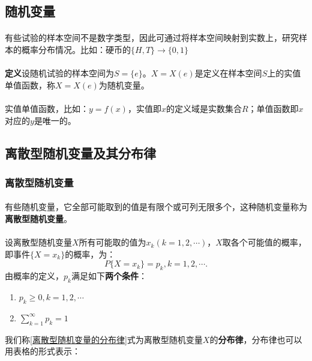 \subsection{随机变量}
\paragraph{}
有些试验的样本空间不是数字类型，因此可通过将样本空间映射到实数上，研究样本的概率分布情况。比如：硬币的$\{H,T\} \to \{0, 1\}$
\paragraph{}
\textbf{定义\;}设随机试验的样本空间为$S=\{e\}$。$X = X(e)$是定义在样本空间$S$上的实值单值函数，称$X=X(e)$为随机变量。

\paragraph{}
实值单值函数，比如：$y=f(x)$，实值即$x$的定义域是实数集合$R$；单值函数即$x$对应的$y$是唯一的。

\subsection{离散型随机变量及其\textbf{分布律}}
\subsubsection{离散型随机变量}
\paragraph{}
有些随机变量，它全部可能取到的值是有限个或可列无限多个，这种随机变量称为\textbf{离散型随机变量}。

\paragraph{}
设离散型随机变量$X$所有可能取的值为$x_k(k=1,2,\cdots)$，$X$取各个可能值的概率，即事件$\{X = x_k\}$的概率，为：
\begin{equation}
  \label{离散型随机变量的分布律}
  P\{X = x_k\} = p_k, k = 1, 2, \cdots.
\end{equation}
由概率的定义，$p_k$满足如下\textbf{两个条件}：

\label{离散型随机变量的条件}
\begin{enumerate}
  \item $p_k \geq 0, k = 1, 2, \cdots$
  \item $\displaystyle \sum_{k=1}^\infty p_k = 1$
\end{enumerate}
我们称\eqref{离散型随机变量的分布律}式为离散型随机变量$X$的\textbf{分布律}，分布律也可以用表格的形式表示：

